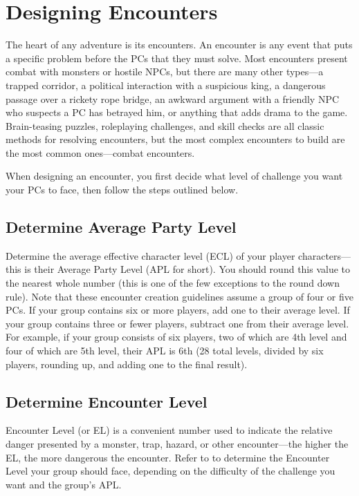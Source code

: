 \section{Designing Encounters}
The heart of any adventure is its encounters. An encounter is any event that puts a specific problem before the PCs that they must solve. Most encounters present combat with monsters or hostile NPCs, but there are many other types---a trapped corridor, a political interaction with a suspicious king, a dangerous passage over a rickety rope bridge, an awkward argument with a friendly NPC who suspects a PC has betrayed him, or anything that adds drama to the game. Brain-teasing puzzles, roleplaying challenges, and skill checks are all classic methods for resolving encounters, but the most complex encounters to build are the most common ones---combat encounters.

When designing an encounter, you first decide what level of challenge you want your PCs to face, then follow the steps outlined below.

\subsection{Determine Average Party Level}
Determine the average effective character level (ECL) of your player characters---this is their Average Party Level (APL for short). You should round this value to the nearest whole number (this is one of the few exceptions to the round down rule). Note that these encounter creation guidelines assume a group of four or five PCs. If your group contains six or more players, add one to their average level. If your group contains three or fewer players, subtract one from their average level. For example, if your group consists of six players, two of which are 4th level and four of which are 5th level, their APL is 6th (28 total levels, divided by six players, rounding up, and adding one to the final result).

\subsection{Determine Encounter Level}
Encounter Level (or EL) is a convenient number used to indicate the relative danger presented by a monster, trap, hazard, or other encounter---the higher the EL, the more dangerous the encounter. Refer to  to determine the Encounter Level your group should face, depending on the difficulty of the challenge you want and the group's APL.

